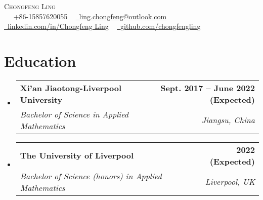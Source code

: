 \documentclass[letterpaper,11pt]{article}
\makeatletter
\newcommand{\resumeSubheading}[4]{
  \vspace{-2pt}\item
    \begin{tabular*}{1.0\textwidth}[t]{l@{\extracolsep{\fill}}r}
      \textbf{#1} & \textbf{\small #2} \\
      \textit{\small#3} & \textit{\small #4} \\
    \end{tabular*}\vspace{-7pt}
}
\newcommand{\resumeSubHeadingListStart}{\begin{itemize}[leftmargin=0.0in, label={}]}
\newcommand{\resumeSubHeadingListEnd}{\end{itemize}}
\makeatother
\begin{document}

\begin{center}
    {\Huge \scshape Chongfeng Ling} \\ \vspace{1pt} ~
    \small \raisebox{-0.1\height}\faPhone\ +86-15857620055 ~ \href{mailto:ling.chongfeng@outlook.com}{\raisebox{-0.2\height}\faEnvelope\  \underline{ling.chongfeng@outlook.com}} ~ 
    \href{https://www.linkedin.com/in/chongfeng-ling-6129561a7/}{\raisebox{-0.2\height}\faLinkedin\ \underline{linkedin.com/in/Chongfeng Ling}}  ~
    \href{https://github.com/chongfengling}{\raisebox{-0.2\height}\faGithub\ \underline{github.com/chongfengling}}
    \vspace{-8pt}
\end{center}


\section{Education}
  \resumeSubHeadingListStart
    \resumeSubheading
      {Xi'an Jiaotong-Liverpool University}{Sept. 2017 -- June 2022 (Expected)}
      {Bachelor of Science in Applied Mathematics}{Jiangsu, China}

    \resumeSubheading
      {The University of Liverpool}{2022 (Expected)}
      {Bachelor of Science (honors) in Applied Mathematics}{Liverpool, UK}
  \resumeSubHeadingListEnd

\end{document}
